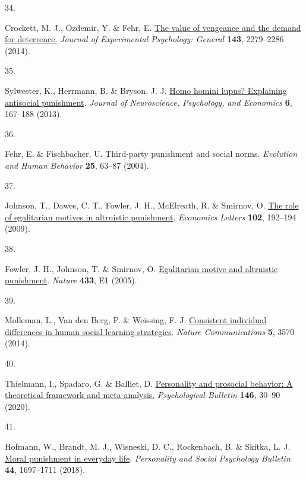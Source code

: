 \documentclass[
  man,floatsintext]{apa6}
\newlength{\cslhangindent}
\newlength{\csllabelwidth}
\newlength{\cslentryspacingunit} %
\newenvironment{CSLReferences}[2] %
 {%
  \setlength{\parindent}{0pt}
  \ifodd #1
  \let\oldpar\par
  \def\par{\hangindent=\cslhangindent\oldpar}
  \fi
  \setlength{\parskip}{#2\cslentryspacingunit}
 }%
 {}
\newcommand{\CSLLeftMargin}[1]{\parbox[t]{\csllabelwidth}{#1}}
\newcommand{\CSLRightInline}[1]{\parbox[t]{\linewidth - \csllabelwidth}{#1}\break}
\begin{document}
\begin{CSLReferences}{0}{0}
\leavevmode{}%
\CSLLeftMargin{34. }%
\CSLRightInline{Crockett, M. J., Özdemir, Y. \& Fehr, E. \href{https://doi.org/10.1037/xge0000018}{The value of vengeance and the demand for deterrence.} \emph{Journal of Experimental Psychology: General} \textbf{143}, 2279--2286 (2014).}

\leavevmode{}%
\CSLLeftMargin{35. }%
\CSLRightInline{Sylwester, K., Herrmann, B. \& Bryson, J. J. \href{https://doi.org/10.1037/npe0000009}{Homo homini lupus? Explaining antisocial punishment}. \emph{Journal of Neuroscience, Psychology, and Economics} \textbf{6}, 167--188 (2013).}

\leavevmode{}%
\CSLLeftMargin{36. }%
\CSLRightInline{Fehr, E. \& Fischbacher, U. Third-party punishment and social norms. \emph{Evolution and Human Behavior} \textbf{25}, 63--87 (2004).}

\leavevmode{}%
\CSLLeftMargin{37. }%
\CSLRightInline{Johnson, T., Dawes, C. T., Fowler, J. H., McElreath, R. \& Smirnov, O. \href{https://doi.org/10.1016/j.econlet.2009.01.003}{The role of egalitarian motives in altruistic punishment}. \emph{Economics Letters} \textbf{102}, 192--194 (2009).}

\leavevmode{}%
\CSLLeftMargin{38. }%
\CSLRightInline{Fowler, J. H., Johnson, T. \& Smirnov, O. \href{https://doi.org/10.1038/nature03256}{Egalitarian motive and altruistic punishment}. \emph{Nature} \textbf{433}, E1 (2005).}

\leavevmode{}%
\CSLLeftMargin{39. }%
\CSLRightInline{Molleman, L., Van den Berg, P. \& Weissing, F. J. \href{https://doi.org/10.1038/ncomms4570}{Consistent individual differences in human social learning strategies}. \emph{Nature Communications} \textbf{5}, 3570 (2014).}

\leavevmode{}%
\CSLLeftMargin{40. }%
\CSLRightInline{Thielmann, I., Spadaro, G. \& Balliet, D. \href{https://doi.org/10.1037/bul0000217}{Personality and prosocial behavior: A theoretical framework and meta-analysis.} \emph{Psychological Bulletin} \textbf{146}, 30--90 (2020).}

\leavevmode{}%
\CSLLeftMargin{41. }%
\CSLRightInline{Hofmann, W., Brandt, M. J., Wisneski, D. C., Rockenbach, B. \& Skitka, L. J. \href{https://doi.org/10.1177/0146167218775075}{Moral punishment in everyday life}. \emph{Personality and Social Psychology Bulletin} \textbf{44}, 1697--1711 (2018).}


\end{CSLReferences}
\end{document}
